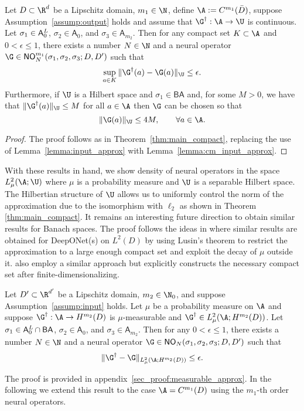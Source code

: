 \begin{theorem}
\label{thm:cm_compact}
Let \(D \subset \R^d\) be a Lipschitz domain, \(m_1 \in \N\), define \(\A := C^{m_1}(\bar{D})\), suppose Assumption~\ref{assump:output} holds and
assume that  \(\G^\dagger : \A \to \U\) is continuous.
Let \(\sigma_1 \in \mathsf{A}^{\emph{\text{L}}}_0\), \(\sigma_2 \in \mathsf{A}_0\), and \(\sigma_3 \in \mathsf{A}_{m_2}\).
Then for any compact set \(K \subset \A\) and \(0 < \epsilon \leq 1\), there exists a number \(N \in \N\) and a neural operator 
\(\G \in \mathsf{NO}_{N}^{m_1}(\sigma_1,\sigma_2,\sigma_3;D,D')\) such that
\[\sup_{a \in K} \|\G^\dagger (a) - \G (a) \|_{\U} \leq \epsilon.\]
Furthermore, if \(\U\) is a Hilbert space and \(\sigma_1 \in \mathsf{BA}\) and, for some \(M > 0\), we have that \(\|\G^\dagger (a)\|_{\U} \leq M\) for all 
\(a \in \A\) then \(\G\) can be chosen so that
\[\|\G(a)\|_{\U} \leq 4M, \qquad \forall a \in \A.\]
\end{theorem}
\begin{proof}
The proof follows as in Theorem~\ref{thm:main_compact}, replacing the use of Lemma~\ref{lemma:input_approx} with Lemma~\ref{lemma:cm_input_approx}.
\end{proof}

With these results in hand, we show density of neural operators in the space \(L^2_\mu (\A;\U)\)
where \(\mu\) is a probability measure and \(\U\) is a separable Hilbert space. The Hilbertian structure of \(\U\) allows us to uniformly control the norm of the approximation due to the isomorphism with \(\ell_2\) as shown in Theorem \ref{thm:main_compact}. It remains an interesting future direction to obtain similar results for Banach spaces. The proof follows the ideas in \citep{lanthaler2021error} where similar results are obtained for DeepONet(s) on \(L^2(D)\) by using Lusin's theorem to restrict the approximation to a large enough compact set and exploit the decay of \(\mu\) outside it. \cite{Kovachki} also employ a similar approach but explicitly constructs the necessary compact set after finite-dimensionalizing. 
 
\begin{theorem}
\label{thm:measurable_approx}
Let \(D' \subset \R^{d'}\) be a Lipschitz domain, \(m_2 \in \N_0\), and suppose Assumption~\ref{assump:input} holds.
Let \(\mu\) be a probability measure on \(\A\) and suppose \(\G^\dagger : \A \to H^{m_2}(D)\) is \(\mu\)-measurable and \(\G^\dagger \in L^2_\mu (\A;H^{m_2}(D))\).
Let \(\sigma_1 \in \mathsf{A}^{\emph{\text{L}}}_0 \cap \mathsf{BA}\), \(\sigma_2 \in \mathsf{A}_0\), and \(\sigma_3 \in \mathsf{A}_{m_2}\).
Then for any \(0 < \epsilon \leq 1\), there exists a number \(N \in \N\) and a neural operator 
\(\G \in \mathsf{NO}_{N}(\sigma_1,\sigma_2,\sigma_3;D,D')\) such that
\[\|\G^\dagger  - \G  \|_{L^2_\mu(\A;H^{m_2}(D))} \leq \epsilon.\]
\end{theorem}
The proof is provided in appendix~\ref{sec_proof:measurable_approx}. In the following we extend this result to the case \(\A = C^{m_1}(D)\) using the \(m_1\)-th order neural operators.

